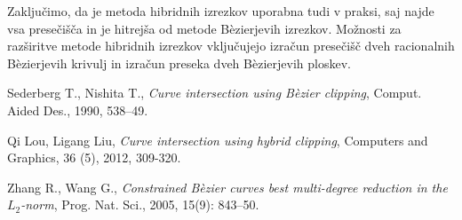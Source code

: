 \documentclass[12pt,a4paper, reqno]{amsart}
\begin{document}
Zaključimo, da je metoda hibridnih izrezkov uporabna tudi v praksi, saj najde vsa presečišča in je hitrejša od metode B\`{e}zierjevih izrezkov. Možnosti za razširitve metode hibridnih izrezkov vključujejo izračun presečišč dveh racionalnih B\`{e}zierjevih krivulj in izračun preseka dveh B\`{e}zierjevih ploskev.

\begin{thebibliography}{99}

 Sederberg T., Nishita T., {\em Curve intersection using B\`{e}zier clipping}, Comput.
Aided Des., 1990, 538--49.

Qi Lou, Ligang Liu, {\em Curve intersection using hybrid clipping}, Computers and
Graphics, 36 (5), 2012, 309-320.

Zhang R., Wang G., {\em Constrained B\`{e}zier curves best multi-degree reduction in
the $L_2$-norm}, Prog. Nat. Sci., 2005, 15(9): 843–50.

%

\end{thebibliography}
\end{document}
